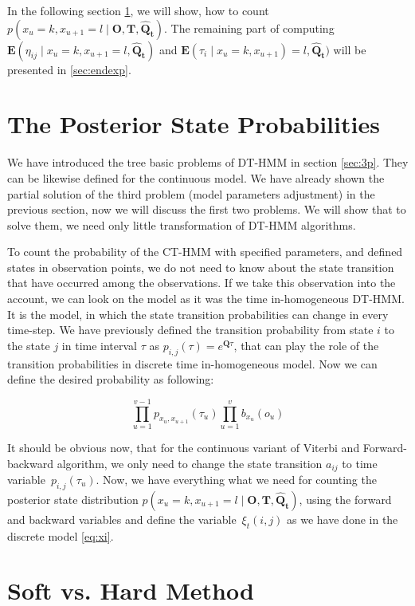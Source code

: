 \documentclass[thesis=M,english]{FITthesis}[2012/10/20]
\newcommand{\matr}[1]{\mathbf{#1}}
\begin{document}
In the following section \ref{sec:pos}, we will show, how to count $p(x_u = k,x_{u+1} = l \mid \matr{O},\matr{T}, \matr{ \hat Q_t })$. The remaining part of computing $\mathbf{E}(\eta_{ij} \mid x_u = k, x_{u+1} = l,\matr{\hat Q_t} )$ and $\mathbf{E}(\tau_i \mid x_u = k, x_{u+1}) = l, \matr{ \hat Q_t } )$ will be presented in \ref{sec:endexp}. 

\section{The Posterior State Probabilities}\label{sec:pos}

We have introduced the tree basic problems of DT-HMM in section \ref{sec:3p}. They can be likewise defined for the continuous model. We have already shown the partial solution of the third problem (model parameters adjustment) in the previous section, now we will discuss the first two problems. We will show that to solve them, we need only little transformation of DT-HMM algorithms.

To count the probability of the CT-HMM with specified parameters, and defined states in observation points, we do not need to know about the state transition that have occurred among the observations.
If we take this observation into the account, we can look on the model as it was the time in-homogeneous DT-HMM. It is the model, in which the state transition probabilities can change in every time-step. We have previously defined the transition probability from state $i$ to the state $j$ in time interval $\tau$ as $p_{i,j}( \tau ) = e^{ \matr{Q} \tau}$, that can play the role of the transition probabilities in discrete time in-homogeneous model. Now we can define the desired probability as following:

\begin{equation}
\prod_{u=1}^{v-1} p_{x_u, x_{u+1}}(\tau_u) \prod_{u=1}^{v} b_{ x_u }(o_u)
\end{equation}

It should be obvious now, that for the continuous variant of Viterbi and Forward-backward algorithm, we only need to change the state transition $a_{ij}$ to time variable~$p_{i,j}( \tau_u )$.   
Now, we have everything what we need for counting the posterior state distribution $p( x_u = k, x_{u+1} = l \mid \matr{O},\matr{T}, \matr{ \hat Q_t } )$, using the forward and backward variables and define the variable~$\xi_t(i,j)$ as we have done in the discrete model \eqref{eq:xi}.

\section{Soft vs. Hard Method}
\end{document}
